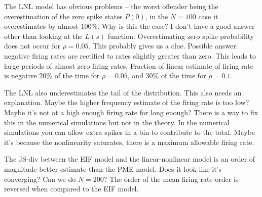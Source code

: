 \documentclass[%
 reprint,
 amsmath,amssymb,
 aps,
floatfix,
]{revtex4-1}
\begin{document}
\begin{figure}[h]
\end{figure}

The LNL model has obvious problems -- the worst offender being the overestimation of the zero spike states $P(0)$, in the $N=100$ case it overestimates by almost $100\%$. Why is this the case? I don't have a good answer other than looking at the $L(s)$ function. Overestimating zero spike probability does not occur for $\rho = 0.05$. This probably gives us a clue. Possible answer: negative firing rates are rectified to rates slightly greater than zero. This leads to large periods of almost zero firing rates. Fraction of linear estimate of firing rate is negative $20\%$ of the time for $\rho = 0.05$, and $30\%$ of the time for $\rho=0.1$.

The LNL also underestimates the tail of the distribution. This also needs an explanation. Maybe the higher frequency estimate of the firing rate is too low? Maybe it's not at a high enough firing rate for long enough? There is a way to fix this in the numerical simulations but not in the theory. In the numerical simulations you can allow extra spikes in a bin to contribute to the total. Maybe it's because the nonlinearity saturates, there is a maximum allowable firing rate.

The JS-div between the EIF model and the linear-nonlinear model is an order of magnitude better estimate than the PME model. Does it look like it's converging? Can we do $N=200$? The order of the mean firing rate order is reversed when compared to the EIF model. \colorbox{BrickRed}{\color{White}{Incomplete.}}



\end{document}
